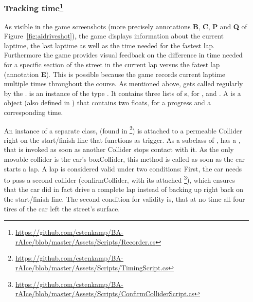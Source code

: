 \subsubsection{Tracking time\footnote{\url{https://github.com/cstenkamp/BA-rAIce/blob/master/Assets/Scripts/Recorder.cs}}}

As visible in the game screenshots (more precisely annotations \textbf{B}, \textbf{C}, \textbf{P} and \textbf{Q} of Figure~\ref{fig:aidriveshot}), the game displays information about the current laptime, the last laptime as well as the time needed for the fastest lap. Furthermore the game provides visual feedback on the difference in time needed for a specific section of the street in the current lap versus the fatest lap (annotation \textbf{E}). This is possible because the game records current laptime multiple times throughout the course. As mentioned above,  gets called regularly by the .  is an instance of the type . It contains three lists of s, for ,  and . A  is a  object (also defined in ) that contains two floats, for a progress and a corresponding time.

An instance of a separate class,  (found in \footnote{\url{https://github.com/cstenkamp/BA-rAIce/blob/master/Assets/Scripts/TimingScript.cs}}) is attached to a permeable Collider right on the start/finish line that functions as trigger. As a subclass of ,  has a , that is invoked as soon as another Collider stops contact with it. As the only movable collider is the car's boxCollider, this method is called as soon as the car starts a lap. A lap is considered valid under two conditions: First, the car needs to pass a second collider (confirmCollider, with its attached \footnote{\url{https://github.com/cstenkamp/BA-rAIce/blob/master/Assets/Scripts/ConfirmColliderScript.cs}}), which ensures that the car did in fact drive a complete lap instead of backing up right back on the start/finish line. The second condition for validity is, that at no time all four tires of the car left the street's surface.

